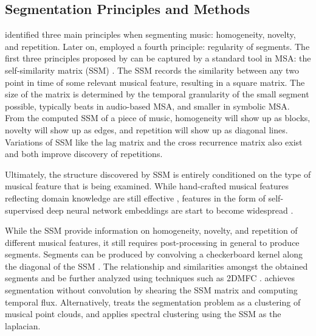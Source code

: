 \subsection{Segmentation Principles and Methods}
\cite{paulus2010audio} identified three main principles when segmenting music: homogeneity, novelty, and repetition.
Later on, \cite{sargent2011regularity} emplo­yed a fourth principle: regularity of segments.
The first three principles proposed by \citeauthor{paulus2010audio} can be captured by a standard tool in MSA: the self-similarity matrix (SSM) \citep{foote1999visualizing}.
The SSM records the similarity between any two point in time of some relevant musical feature, resulting in a square matrix.
The size of the matrix is determined by the temporal granularity of the small segment possible, typically beats in audio-based MSA, and smaller in symbolic MSA.
From the computed SSM of a piece of music, homogeneity will show up as blocks, novelty will show up as edges, and repetition will show up as diagonal lines.
Variations of SSM like the lag matrix \citep{goto2003lag} and the cross recurrence matrix \citep{serra2009cross} also exist and both improve discovery of repetitions.

Ultimately, the structure discovered by SSM is entirely conditioned on the type of musical feature that is being examined.
While hand-crafted musical features reflecting domain knowledge are still effective \citep{mcfee2014_spectral}, features in the form of self-supervised deep neural network embeddings are start to become widespread \citep{salamon2021, mccallum2019unsupervised}.

While the SSM provide information on homogeneity, novelty, and repetition of different musical features, it still requires post-processing in general to produce segments.
Segments can be produced by convolving a checkerboard kernel along the diagonal of the SSM \citep{foote2000automatic}.
The relationship and similarities amongst the obtained segments and be further analyzed using techniques such as 2DMFC \citep{nieto2014}.
\cite{serra2014} achieves segmentation without convolution by shearing the SSM matrix and computing temporal flux.
Alternatively, \cite{mcfee2014_spectral} treats the segmentation problem as a clustering of musical point clouds, and applies spectral clustering using the SSM as the laplacian.

